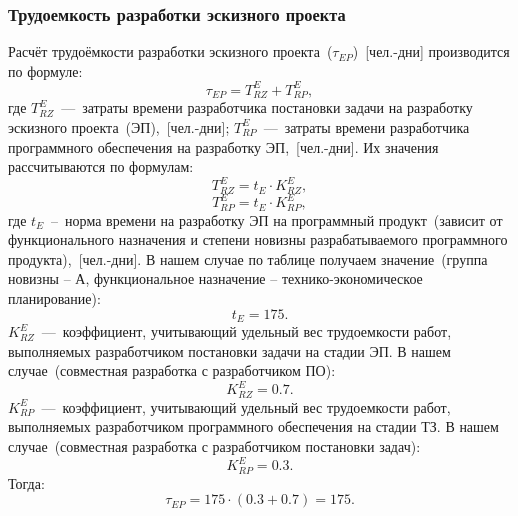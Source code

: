         \subsubsection{Трудоемкость разработки эскизного проекта}
            Расчёт трудоёмкости разработки эскизного проекта~($\tau_{EP}$)~[чел.-дни] производится по формуле:
            \begin{equation}
                \tau_{EP} = T^E_{RZ} + T^E_{RP},
            \end{equation}
            где $T^E_{RZ}$~---~затраты времени разработчика постановки задачи на разработку эскизного проекта~(ЭП),~[чел.-дни];
            $T^E_{RP}$~---~затраты времени разработчика программного обеспечения на разработку ЭП,~[чел.-дни].
            Их значения рассчитываются по формулам:
            \begin{equation}
                T^E_{RZ} = t_E  \cdot  K^E_{RZ},
            \end{equation}
            \begin{equation}
                T^E_{RP} = t_E  \cdot  K^E_{RP},
            \end{equation}
            где $t_E$~--~норма времени на разработку ЭП на программный продукт~(зависит от функционального назначения и степени новизны разрабатываемого программного продукта),~[чел.-дни].
            В нашем случае по таблице получаем значение~(группа новизны – А, функциональное назначение – технико-экономическое планирование):
            \begin{equation*}
                t_E = 175.
            \end{equation*}
            $K^E_{RZ}$~---~коэффициент, учитывающий удельный вес трудоемкости работ, выполняемых разработчиком постановки задачи на стадии ЭП.
            В нашем случае~(совместная разработка с разработчиком ПО):
            \begin{equation*}
                K^E_{RZ} = 0.7.
            \end{equation*}
            $K^E_{RP}$~---~коэффициент, учитывающий удельный вес трудоемкости работ, выполняемых разработчиком программного обеспечения на стадии ТЗ.
            В нашем случае~(совместная разработка с разработчиком постановки задач):
            \begin{equation*}
                K^E_{RP} = 0.3.
            \end{equation*}
            Тогда:
            \begin{equation*}
                \tau_{EP} = 175  \cdot (0.3 + 0.7) = 175.
            \end{equation*}


